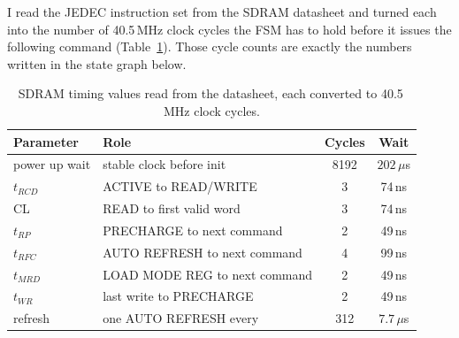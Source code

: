 \documentclass[a4paper,10pt]{article}
\begin{document}
I read the JEDEC instruction set from the SDRAM datasheet
and turned each into the number of 40.5\,MHz clock cycles
the FSM has to hold before it issues the following command (Table~\ref{tab:jedec}).
Those cycle counts are exactly the numbers written in the state graph below.

\begin{table}[H]
\centering
\caption{SDRAM timing values read from the datasheet, each converted to 40.5\,MHz clock cycles.}
\label{tab:jedec}
\small
\begin{tabular}{llcc}
\toprule
\textbf{Parameter} & \textbf{Role} & \textbf{Cycles} & \textbf{Wait} \\
\midrule
power up wait & stable clock before init & 8192 & $202\,\mu$s \\
$t_{RCD}$ & ACTIVE to READ/WRITE & 3 & 74\,ns \\
CL & READ to first valid word & 3 & 74\,ns \\
$t_{RP}$ & PRECHARGE to next command & 2 & 49\,ns \\
$t_{RFC}$ & AUTO REFRESH to next command & 4 & 99\,ns \\
$t_{MRD}$ & LOAD MODE REG to next command & 2 & 49\,ns \\
$t_{WR}$ & last write to PRECHARGE & 2 & 49\,ns \\
refresh & one AUTO REFRESH every & 312 & $7.7\,\mu$s \\
\bottomrule
\end{tabular}
\end{table}
\end{document}

